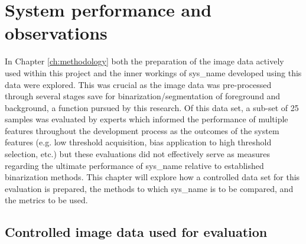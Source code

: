\chapter{System performance and observations}\label{ch:results}
In Chapter \ref{ch:methodology} both the preparation of the image data actively used within this project and the inner workings of \gls{sys_name} developed using this data were explored. This was crucial as the image data was pre-processed through several stages save for binarization/segmentation of foreground and background, a function pursued by this research. Of this data set, a sub-set of 25 samples was evaluated by experts which informed the performance of multiple features throughout the development process as the outcomes of the system features (e.g. low threshold acquisition, bias application to high threshold selection, etc.) but these evaluations did not effectively serve as measures regarding the ultimate performance of \gls{sys_name} relative to established binarization methods. This chapter will explore how a controlled data set for this evaluation is prepared, the methods to which \gls{sys_name} is to be compared, and the metrics to be used.


\section{Controlled image data used for evaluation}\label{sec:controlled_images}

